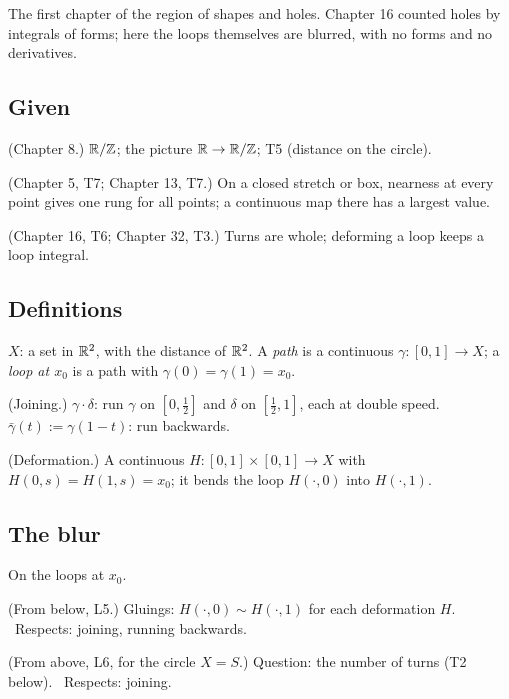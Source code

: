 The first chapter of the region of shapes and holes. Chapter 16 counted holes by integrals of forms; here the loops themselves are blurred, with no forms and no derivatives.

\subsection*{Given}

\begin{lines}
\item[\lab{G1}] (Chapter 8.) $\mathbb{R}/\mathbb{Z}$; the picture $\mathbb{R} \to \mathbb{R}/\mathbb{Z}$; T5 (distance on the circle).
\item[\lab{G2}] (Chapter 5, T7; Chapter 13, T7.) On a closed stretch or box, nearness at every point gives one rung for all points; a continuous map there has a largest value.
\item[\lab{G3}] (Chapter 16, T6; Chapter 32, T3.) Turns are whole; deforming a loop keeps a loop integral.
\end{lines}

\subsection*{Definitions}

\begin{lines}
\item[\lab{D1}] $X$: a set in $\mathbb{R}^2$, with the distance of $\mathbb{R}^2$. A \emph{path} is a continuous $\gamma : [0, 1] \to X$; a \emph{loop at $x_0$} is a path with $\gamma(0) = \gamma(1) = x_0$.
\item[\lab{D2}] (Joining.) $\gamma \cdot \delta$: run $\gamma$ on $[0, \tfrac12]$ and $\delta$ on $[\tfrac12, 1]$, each at double speed. $\bar\gamma(t) := \gamma(1 - t)$: run backwards.
\item[\lab{D3}] (Deformation.) A continuous $H : [0, 1] \times [0, 1] \to X$ with $H(0, s) = H(1, s) = x_0$; it bends the loop $H(\cdot, 0)$ into $H(\cdot, 1)$.
\end{lines}

\subsection*{The blur}

On the loops at $x_0$.

\begin{lines}
\item[\lab{B1}] (From below, L5.) Gluings: $H(\cdot, 0) \sim H(\cdot, 1)$ for each deformation $H$. \ Respects: joining, running backwards.
\item[\lab{B2}] (From above, L6, for the circle $X = S$.) Question: the number of turns (T2 below). \ Respects: joining.
\end{lines}

